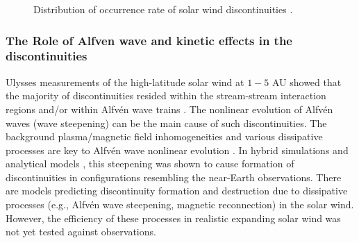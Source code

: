 \documentclass[
  letterpaper,
  DIV=11,
  numbers=noendperiod]{scrartcl}
\begin{document}
\begin{figure}


\caption{\label{fig-1}Distribution of occurrence rate of solar wind discontinuities \citep{sodingRadialLatitudinalDependencies2001}.}

\end{figure}%

\subsubsection{The Role of Alfven wave and kinetic effects in the discontinuities}\label{the-role-of-alfven-wave-and-kinetic-effects-in-the-discontinuities}

Ulysses measurements of the high-latitude solar wind at \(1-5\) AU showed that the majority of discontinuities resided within the stream-stream interaction regions and/or within Alfvén wave trains \citep{tsurutaniInterplanetaryDiscontinuitiesAlfven1995, tsurutaniReviewDiscontinuitiesAlfven1999}. The nonlinear evolution of Alfvén waves (wave steepening) can be the main cause of such discontinuities. The background plasma/magnetic field inhomogeneities and various dissipative processes are key to Alfvén wave nonlinear evolution \citep{Lerche75, Prakash&Diamond99, Medvedev97:prl, Nariyuki14, Yang15}. In hybrid simulations \citep[see][]{Vasquez&Hollweg98, Vasquez&Hollweg01, TenBarge&Howes13} and analytical models \citep[e.g.,][]{Kennel88:jetp, Hada89, Malkov91, Wu&Kennel92, Medvedev97:pop}, this steepening was shown to cause formation of discontinuities in configurations resembling the near-Earth observations. There are models predicting discontinuity formation \citep{Servidio15, Podesta&Roytershteyn17} and destruction \citep{Servidio11,Matthaeus15} due to dissipative processes (e.g., Alfvén wave steepening, magnetic reconnection) in the solar wind. However, the efficiency of these processes in realistic expanding solar wind was not yet tested against observations.
\end{document}
